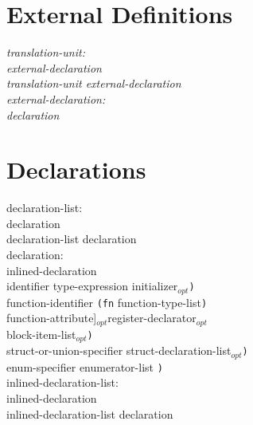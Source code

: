 \documentclass[a4j,twocolumn]{article}
\begin{document}
\newcommand{\opt}{$_{opt}$}

\section{External Definitions}

\it \noindent
translation-unit: \\
\quad external-declaration \\
\quad translation-unit external-declaration \\


\noindent
external-declaration: \\
\quad declaration \\

\rm 
\section{Declarations}
\it 

\noindent
declaration-list: \\
\quad declaration \\
\quad declaration-list declaration \\ 

\noindent
declaration: \\
\quad inlined-declaration \\
\quad {\tt (}identifier type-expression initializer\opt {\tt )} \\
\quad {\tt (}function-identifier {\tt (fn} function-type-list{\tt )} \\
\quad \quad {\rm [}{\tt :attr} function-attribute{\rm ]}\opt register-declarator\opt \\
\quad \quad block-item-list\opt {\tt )} \\ 
\quad {\tt (}struct-or-union-specifier struct-declaration-list\opt {\tt )} \\
\quad {\tt (}enum-specifier enumerator-list {\tt )} \\

\noindent
inlined-declaration-list: \\
\quad inlined-declaration \\
\quad inlined-declaration-list declaration \\ 
\end{document}
